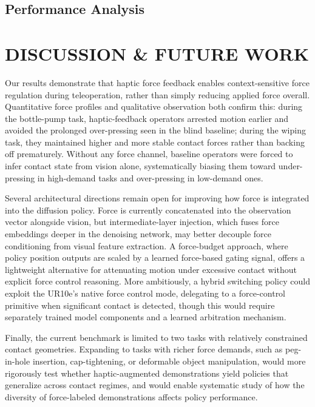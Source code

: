 \documentclass[letterpaper, 10 pt, conference]{ieeeconf}  %
\begin{document}
\subsection{Performance Analysis}


\section{DISCUSSION \& FUTURE WORK}

Our results demonstrate that haptic force feedback enables context-sensitive force regulation during teleoperation, rather than simply reducing applied force overall. Quantitative force profiles and qualitative observation both confirm this: during the bottle-pump task, haptic-feedback operators arrested motion earlier and avoided the prolonged over-pressing seen in the blind baseline; during the wiping task, they maintained higher and more stable contact forces rather than backing off prematurely. Without any force channel, baseline operators were forced to infer contact state from vision alone, systematically biasing them toward under-pressing in high-demand tasks and over-pressing in low-demand ones.

Several architectural directions remain open for improving how force is integrated into the diffusion policy. Force is currently concatenated into the observation vector alongside vision, but intermediate-layer injection, which fuses force embeddings deeper in the denoising network, may better decouple force conditioning from visual feature extraction. A force-budget approach, where policy position outputs are scaled by a learned force-based gating signal, offers a lightweight alternative for attenuating motion under excessive contact without explicit force control reasoning. More ambitiously, a hybrid switching policy could exploit the UR10e's native force control mode, delegating to a force-control primitive when significant contact is detected, though this would require separately trained model components and a learned arbitration mechanism.

Finally, the current benchmark is limited to two tasks with relatively constrained contact geometries. Expanding to tasks with richer force demands, such as peg-in-hole insertion, cap-tightening, or deformable object manipulation, would more rigorously test whether haptic-augmented demonstrations yield policies that generalize across contact regimes, and would enable systematic study of how the diversity of force-labeled demonstrations affects policy performance.
\end{document}
